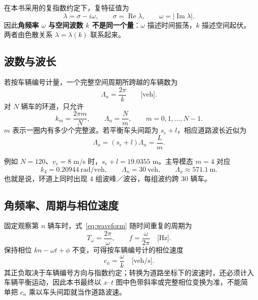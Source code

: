 \documentclass[11pt,a4paper,openany]{book}
\numberwithin{equation}{chapter}
\numberwithin{figure}{chapter}
\numberwithin{table}{chapter}
\begin{document}
在本书采用的复指数约定下，复特征值为
\begin{equation}
\lambda=\sigma-i\omega,
\qquad
\sigma=\operatorname{Re}\lambda,
\qquad
\omega=|\operatorname{Im}\lambda|.
\end{equation}
因此\textbf{角频率 $\omega$ 与空间波数 $k$ 不是同一个量}：$\omega$ 描述时间振荡，$k$ 描述空间起伏。两者由色散关系 $\lambda=\lambda(k)$ 联系起来。

\subsection{波数与波长}

若按车辆编号计量，一个完整空间周期所跨越的车辆数为
\begin{equation}
\Lambda_n=\frac{2\pi}{k}
\qquad\text{[veh]}.
\end{equation}
对 $N$ 辆车的环道，只允许
\begin{equation}
k_m=\frac{2\pi m}{N},
\qquad
\Lambda_n=\frac{N}{m},
\qquad
m=0,1,\ldots,N-1.
\end{equation}
$m$ 表示一圈内有多少个完整波。若平衡车头间距为 $s_e+l$，相应道路波长近似为
\begin{equation}
\Lambda_x=(s_e+l)\Lambda_n=\frac{L}{m}.
\end{equation}

例如 $N=120$、$v_e=8$ m/s 时，$s_e+l=19.0355$ m。主导模态 $m=4$ 对应
\begin{equation}
k_4=0.20944\ \text{rad/veh},
\qquad
\Lambda_n=30\ \text{veh},
\qquad
\Lambda_x\approx571.1\ \text{m}.
\end{equation}
也就是说，环道上同时出现 4 组波峰／波谷，每组波约跨 30 辆车。

\subsection{角频率、周期与相位速度}

固定观察第 $n$ 辆车时，式~\eqref{eq:waveform} 随时间重复的周期为
\begin{equation}
T_\omega=\frac{2\pi}{\omega},
\qquad
f=\frac{\omega}{2\pi}\quad\text{[Hz]}.
\end{equation}
保持相位 $kn-\omega t+\phi$ 不变，可得按车辆编号计的相位速度
\begin{equation}
c_n=\frac{\omega}{k}\quad\text{[veh/s]}.
\end{equation}
其正负取决于车辆编号方向与指数约定；转换为道路坐标下的波速时，还必须计入车辆平衡运动，因此本书最终以 $x$--$t$ 图中色带斜率或完整相位变换为准，不能简单把 $c_n$ 乘以车头间距就当作道路波速。
\end{document}

